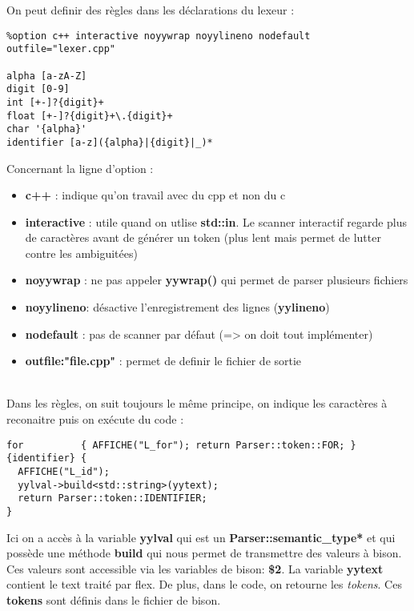 \documentclass[a4paper]{article}
\begin{document}
\noindent
On peut definir des règles dans les déclarations du lexeur :

\begin{lstlisting}
%option c++ interactive noyywrap noyylineno nodefault outfile="lexer.cpp"

alpha [a-zA-Z]
digit [0-9]
int [+-]?{digit}+
float [+-]?{digit}+\.{digit}+
char '{alpha}'
identifier [a-z]({alpha}|{digit}|_)*
\end{lstlisting}\leavevmode\newline

\noindent
Concernant la ligne d'option :
\begin{itemize}
\item \textbf{c++} : indique qu'on travail avec du cpp et non du c
\item \textbf{interactive} : utile quand on utlise \textbf{std::in}. Le scanner interactif regarde plus de caractères avant de générer un token (plus lent mais permet de lutter contre les ambiguitées)
\item \textbf{noyywrap} : ne pas appeler \textbf{yywrap()} qui permet de parser plusieurs fichiers
\item \textbf{noyylineno}: désactive l'enregistrement des lignes (\textbf{yylineno})
\item \textbf{nodefault} : pas de scanner par défaut (=> on doit tout implémenter)
\item \textbf{outfile:"file.cpp"} : permet de definir le fichier de sortie
\end{itemize}\leavevmode\\[3\baselineskip]


\noindent
Dans les règles, on suit toujours le même principe, on indique les caractères à reconaitre puis on exécute du code :\\

\begin{lstlisting}
for          { AFFICHE("L_for"); return Parser::token::FOR; }
{identifier} {
  AFFICHE("L_id");
  yylval->build<std::string>(yytext);
  return Parser::token::IDENTIFIER;
}
\end{lstlisting}\leavevmode\newline

\noindent
Ici on a accès à la variable \textbf{yylval} qui est un \textbf{Parser::semantic\_type*} et qui possède une méthode \textbf{build} qui nous permet de transmettre des valeurs à bison.\\
Ces valeurs sont accessible via les variables de bison: \textbf{\$2}. La variable
\textbf{yytext} contient le text traité par flex. De plus, dans le code, on retourne
les \textit{tokens}. Ces \textbf{tokens} sont définis dans le fichier de bison.
\newline
\end{document}
